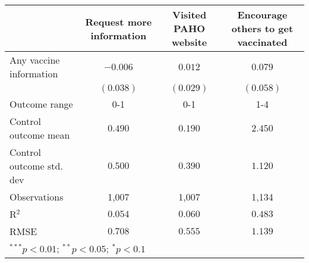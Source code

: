 \begin{table}
\begin{center}
\begin{tabular}{l c c c}
\hline
 & Request more information & Visited PAHO website & Encourage others to get vaccinated \\
\hline
Any vaccine information  & $-0.006$  & $0.012$   & $0.079$   \\
                         & $(0.038)$ & $(0.029)$ & $(0.058)$ \\
\hline
Outcome range            & 0-1       & 0-1       & 1-4       \\
Control outcome mean     & $0.490$   & $0.190$   & $2.450$   \\
Control outcome std. dev & $0.500$   & $0.390$   & $1.120$   \\
Observations             & 1,007     & 1,007     & 1,134     \\
R$^{2}$                  & $0.054$   & $0.060$   & $0.483$   \\
RMSE                     & $0.708$   & $0.555$   & $1.139$   \\
\hline
\multicolumn{4}{l}{\scriptsize{$^{***}p<0.01$; $^{**}p<0.05$; $^{*}p<0.1$}}
\end{tabular}
\caption{}
\label{table:Tables and Figures/SI_table21_anyinfo_Brazil_behav}
\end{center}
\end{table}
